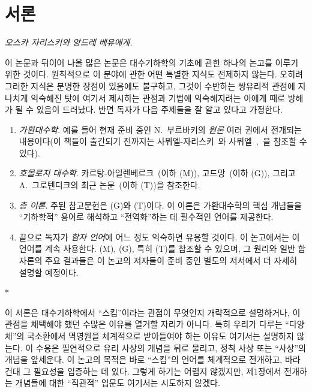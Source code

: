 \section*{서론}

\begin{center}
\emph{오스카 자리스키와 앙드레 베유에게.}
\end{center}


이 논문과 뒤이어 나올 많은 논문은 대수기하학의 기초에 관한 하나의 논고를 이루기 위한 것이다.
원칙적으로 이 분야에 관한 어떤 특별한 지식도 전제하지 않는다. 오히려 그러한 지식은 분명한 장점이 있음에도 불구하고, 그것이 수반하는 쌍유리적 관점에 지나치게 익숙해진 탓에 여기서 제시하는 관점과 기법에 익숙해지려는 이에게 때로 방해가 될 수 있음이 드러났다.
반면 독자가 다음 주제들을 잘 알고 있다고 가정한다.

\begin{enumerate}
  \item[a)] \emph{가환대수학}. 예를 들어 현재 준비 중인 N.~부르바키의 \emph{원론} 여러 권에서 전개되는 내용이다(이 책들이 출간되기 전까지는 사뮈엘-자리스키~\cite{I-13}와 사뮈엘~\cite{I-11},~\cite{I-12}을 참조할 수 있다).
  \item[b)] \emph{호몰로지 대수학}. 카르탕-아일렌베르크~\cite{I-2}(이하 (M)), 고드망~\cite{I-4}(이하 (G)), 그리고 A.~그로텐디크의 최근 논문~\cite{I-6}(이하 (T))을 참조한다.
  \item[c)] \emph{층 이론}. 주된 참고문헌은 (G)와 (T)이다. 이 이론은 가환대수학의 핵심 개념들을 ``기하학적'' 용어로 해석하고 ``전역화''하는 데 필수적인 언어를 제공한다.
  \item[d)] 끝으로 독자가 \emph{함자 언어}에 어느 정도 익숙하면 유용할 것이다. 이 논고에서는 이 언어를 계속 사용한다. (M), (G), 특히 (T)를 참조할 수 있으며, 그 원리와 일반 함자론의 주요 결과들은 이 논고의 저자들이 준비 중인 별도의 저서에서 더 자세히 설명할 예정이다.
\end{enumerate}

\bigskip
\begin{center}*\quad*\quad*\end{center}
\bigskip

이 서론은 대수기하학에서 ``스킴''이라는 관점이 무엇인지 개략적으로 설명하거나, 이 관점을 채택해야 했던 수많은 이유를 열거할 자리가 아니다. 특히 우리가 다루는 ``다양체''의 국소환에서 멱영원을 체계적으로 받아들여야 하는 이유도 여기서는 설명하지 않는다. 이 수용은 필연적으로 유리 사상의 개념을 뒤로 물리고, 정칙 사상 또는 ``사상''의 개념을 앞세운다.
이 논고의 목적은 바로 ``스킴''의 언어를 체계적으로 전개하고, 바라건대 그 필요성을 입증하는 데 있다.
그렇게 하기는 어렵지 않겠지만, 제1장에서 전개하는 개념들에 대한 ``직관적'' 입문도 여기서는 시도하지 않겠다.

